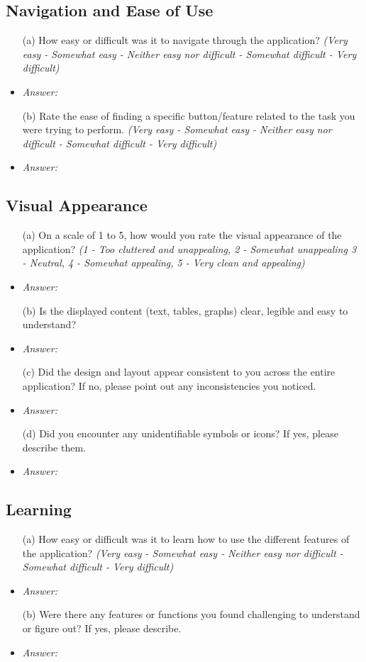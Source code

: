\documentclass{article}
\begin{document}
\subsection*{\textbf{Navigation and Ease of Use}}
  \begin{itemize}
    \item[(a)] How easy or difficult was it to navigate through the
    application? \textit{(Very easy - Somewhat easy - Neither easy nor difficult
    - Somewhat difficult - Very difficult)}
    \item \emph{Answer:} 
    \item[(b)] Rate the ease of finding a specific button/feature related to the
    task you were trying to perform. \textit{(Very easy - Somewhat easy -
    Neither easy nor difficult - Somewhat difficult - Very difficult)}
    \item \emph{Answer:}
  \end{itemize}

\subsection*{\textbf{Visual Appearance}}
  \begin{itemize}
    \item[(a)] On a scale of 1 to 5, how would you rate the visual appearance of
    the application? \textit{(1 - Too cluttered and unappealing, 2 - Somewhat
    unappealing 3 - Neutral, 4 - Somewhat appealing, 5 - Very clean and
    appealing)}
    \item \emph{Answer:}
    \item[(b)] Is the displayed content (text, tables, graphs) clear, legible
    and easy to understand?
    \item \emph{Answer:}
    \item[(c)] Did the design and layout appear consistent to you across
    the entire application? If no, please point out any inconsistencies you noticed.
    \item \emph{Answer:}
    \item[(d)] Did you encounter any unidentifiable symbols or icons? If yes,
    please describe them.
    \item \emph{Answer:}
  \end{itemize}

\subsection*{\textbf{Learning}}
  \begin{itemize}
    \item[(a)] How easy or difficult was it to learn how to use the different
    features of the application? \textit{(Very easy - Somewhat easy - Neither
    easy nor difficult - Somewhat difficult - Very difficult)}
    \item \emph{Answer:}
    \item[(b)] Were there any features or functions you found challenging to
    understand or figure out? If yes, please describe. 
    \item \emph{Answer:}
  \end{itemize}
\end{document}
